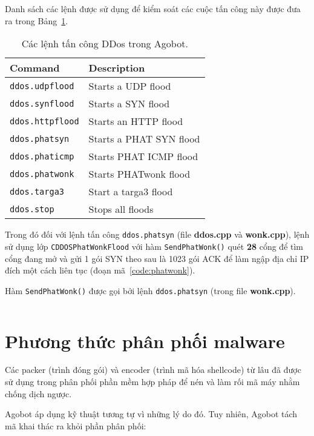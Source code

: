 Danh sách các lệnh được sử dụng để kiểm soát các cuộc tấn công này được đưa ra trong Bảng~\ref{table:botattack}.

\begin{table}[ht]
	\caption{Các lệnh tấn công DDos trong Agobot.}\label{table:botattack}
	\centering
	\footnotesize
	\begin{tabular}{l l}
		\toprule
		\textbf{Command} &
		\textbf{Description} \\
		\midrule
\texttt{ddos.udpflood} & Starts a UDP flood\\
\texttt{ddos.synflood} & Starts a SYN flood\\
\texttt{ddos.httpflood} & Starts an HTTP flood\\
\texttt{ddos.phatsyn} & Starts a PHAT SYN flood\\
\texttt{ddos.phaticmp} & Starts PHAT ICMP flood\\
\texttt{ddos.phatwonk} & Starts PHATwonk flood\\
\texttt{ddos.targa3} & Start a targa3 flood\\
\texttt{ddos.stop} & Stops all floods\\
		\bottomrule
	\end{tabular}
\end{table}

Trong đó đối với lệnh tấn công \texttt{ddos.phatsyn} 
(file \textbf{ddos.cpp} và \textbf{wonk.cpp}), 
lệnh sử dụng lớp \texttt{CDDOSPhatWonkFlood}
với hàm \texttt{SendPhatWonk()} quét \textbf{28} cổng để tìm cổng đang mở 
và gửi 1 gói SYN theo sau là 1023 gói ACK để làm ngập 
địa chỉ IP đích một cách liên tục (đoạn mã~\ref{code:phatwonk}).

\begin{listing}[ht]
	\caption{Hàm \texttt{SendPhatWonk()} được gọi bởi lệnh \texttt{ddos.phatsyn} (trong file \textbf{wonk.cpp}).}\label{code:phatwonk}
	\inputminted{cpp}{./listings/phatwonk.cpp}
\end{listing}

\section{Phương thức phân phối malware}
Các \gls{packer} (trình đóng gói) và \gls{encoder} (trình mã hóa shellcode) từ lâu đã được sử dụng
trong phân phối phần mềm hợp pháp để nén và làm rối mã máy nhằm chống dịch ngược.

Agobot áp dụng kỹ thuật tương tự vì những lý do đó.
Tuy nhiên, Agobot tách mã khai thác ra khỏi phần phân phối:

